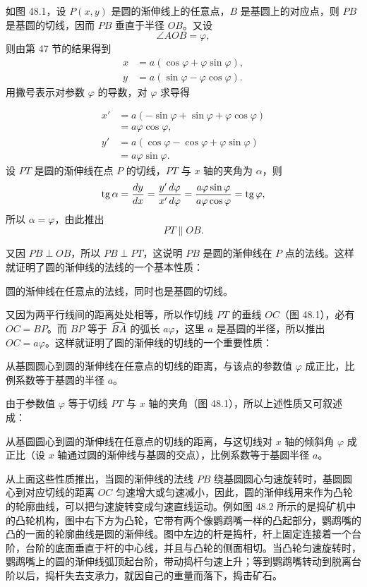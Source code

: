 \hfill
\begin{minipage}[c]{0.52\textwidth}
如图 48.1，设 $P(x,y)$ 是圆的渐伸线上的任意点，$B$ 是基圆上的对应点，则 $PB$ 是基圆的切线，因而 $PB$ 垂直于半径 $OB$。又设
\[
  \angle AOB = \varphi,
\]
则由第 47 节的结果得到
\begin{align*}
  x &= a(\cos\varphi + \varphi\sin\varphi), \\
  y &= a(\sin\varphi - \varphi\cos\varphi).
\end{align*}
用撇号表示对参数 $\varphi$ 的导数，对 $\varphi$ 求导得
\end{minipage}
\begin{align*}
  x' &= a(-\sin\varphi + \sin\varphi + \varphi\cos\varphi) \\
     &= a\varphi\cos\varphi, \\
  y' &= a(\cos\varphi - \cos\varphi + \varphi\sin\varphi) \\
     &= a\varphi\sin\varphi.
\end{align*}
设 $PT$ 是圆的渐伸线在点 $P$ 的切线，$PT$ 与 $x$ 轴的夹角为 $\alpha$，则
\[
  \operatorname{tg}\alpha = \frac{dy}{dx} = \frac{y'\,d\varphi}{x'\,d\varphi} = \frac{a\varphi\sin\varphi}{a\varphi\cos\varphi} = \operatorname{tg}\varphi,
\]
所以 $\alpha=\varphi$，由此推出
\[
  PT \parallel OB.
\]

又因 $PB\perp OB$，所以 $PB\perp PT$，这说明 $PB$ 是圆的渐伸线在 $P$ 点的法线。这样就证明了圆的渐伸线的法线的一个基本性质：

圆的渐伸线在任意点的法线，同时也是基圆的切线。

又因为两平行线间的距离处处相等，所以作切线 $PT$ 的垂线 $OC$（图 48.1），必有 $OC=BP$。而 $BP$ 等于 $\arc{BA}$ 的弧长 $a\varphi$，这里 $a$ 是基圆的半径，所以推出 $OC=a\varphi$。这样就证明了圆的渐伸线的切线的一个重要性质：

从基圆圆心到圆的渐伸线在任意点的切线的距离，与该点的参数值 $\varphi$ 成正比，比例系数等于基圆的半径 $a$。

由于参数值 $\varphi$ 等于切线 $PT$ 与 $x$ 轴的夹角（图 48.1），所以上述性质又可叙述成：

从基圆圆心到圆的渐伸线在任意点的切线的距离，与这切线对 $x$ 轴的倾斜角 $\varphi$ 成正比（设 $x$ 轴通过圆的渐伸线与基圆的交点），比例系数等于基圆半径 $a$。

从上面这些性质推出，当圆的渐伸线的法线 $PB$ 绕基圆圆心匀速旋转时，基圆圆心到对应切线的距离 $OC$ 匀速增大或匀速减小，因此，圆的渐伸线用来作为凸轮的轮廓曲线，可以把匀速旋转变成匀速直线运动。例如图 48.2 所示的是捣矿机中的凸轮机构，图中右下方为凸轮，它带有两个像鹦鹉嘴一样的凸起部分，鹦鹉嘴的凸的一面的轮廓曲线是圆的渐伸线。图中左边的杆是捣杆，杆上固定连接着一个台阶，台阶的底面垂直于杆的中心线，并且与凸轮的侧面相切。当凸轮匀速旋转时，鹦鹉嘴上的圆的渐伸线弧顶起台阶，带动捣杆匀速上升；等到鹦鹉嘴转动到脱离台阶以后，捣杆失去支承力，就因自己的重量而落下，捣击矿石。

